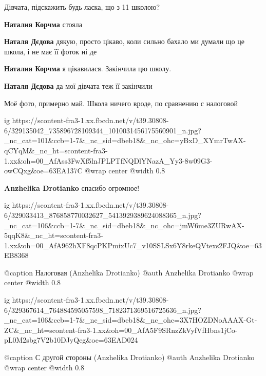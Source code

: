 
Дівчата, підскажить будь ласка, що з 11 школою?

\begin{itemize} %
\textbf{Наталия Корчма} стояла

\textbf{Наталя Дєдова} дякую, просто цікаво, коли сильно бахало ми думали що це школа, і не має її фоток ні де

\textbf{Наталия Корчма} я цікавилася. Закінчила цю школу.

\textbf{Наталя Дєдова} да мої дівчата теж її закінчили
\end{itemize} %


Моё фото, примерно май. Школа ничего вроде, по сравнению с налоговой

\ifcmt
  ig https://scontent-fra3-1.xx.fbcdn.net/v/t39.30808-6/329135042_735896728109344_1010031456175560901_n.jpg?_nc_cat=101&ccb=1-7&_nc_sid=dbeb18&_nc_ohc=yBxD_XYmrTwAX-qCYqM&_nc_ht=scontent-fra3-1.xx&oh=00_AfAss3FwXf5lnJPLPTfNQDlYNazA_Yy3-8w09G3-owCQxg&oe=63EA137C
  @wrap center
  @width 0.8
\fi

\begin{itemize} %
\textbf{Anzhelika Drotianko} спасибо огромное!
\end{itemize} %

\begin{minipage}{\textwidth}

\ifcmt
  ig https://scontent-fra3-1.xx.fbcdn.net/v/t39.30808-6/329033413_876858770032627_5413929389624088365_n.jpg?_nc_cat=106&ccb=1-7&_nc_sid=dbeb18&_nc_ohc=jmW6me3ZURwAX-5qqK8&_nc_ht=scontent-fra3-1.xx&oh=00_AfA962hXF8qcPKPmixUc7_v10SSLSx6Y8rkeQVtexs2FJQ&oe=63EB8368

  @caption Налоговая (Anzhelika Drotianko)
  @auth Anzhelika Drotianko
  @wrap center
  @width 0.8
\fi
\end{minipage}

\begin{minipage}{\textwidth}

\ifcmt
  ig https://scontent-fra3-1.xx.fbcdn.net/v/t39.30808-6/329367614_764884595057598_7182371369516725636_n.jpg?_nc_cat=106&ccb=1-7&_nc_sid=dbeb18&_nc_ohc=3X7HOZDNoAAAX-Gt-ZC&_nc_ht=scontent-fra3-1.xx&oh=00_AfA5F9SRnzZkVyfVfHbns1jCo-pL0M2sbg7V2b10DJyQeg&oe=63EAD024

  @caption С другой стороны (Anzhelika Drotianko)
  @auth Anzhelika Drotianko
  @wrap center
  @width 0.8
\fi
\end{minipage}

